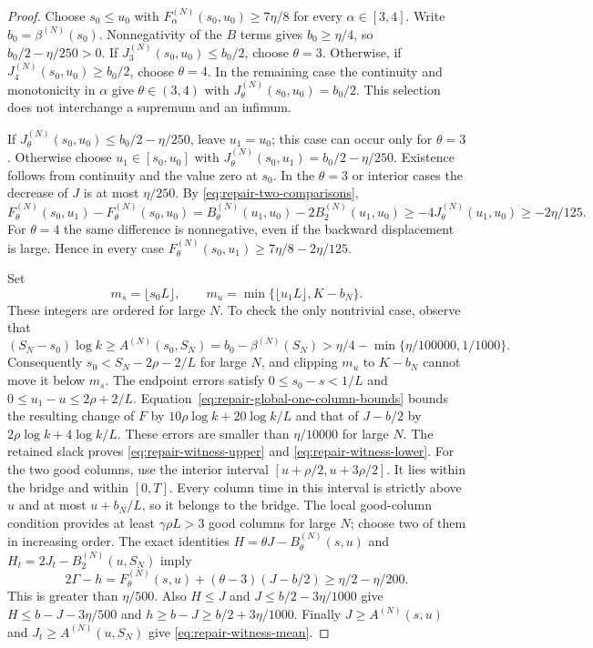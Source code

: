 \documentclass[11pt]{article}
\numberwithin{equation}{section}
\theoremstyle{definition}
\theoremstyle{remark}
\newcommand{\1}{\mathbf 1}
\begin{document}
\begin{proof}
Choose $s_0\le u_0$ with
$F_\alpha^{(N)}(s_0,u_0)\ge7\eta/8$ for every $\alpha\in[3,4]$.
Write $b_0=\beta^{(N)}(s_0)$.  Nonnegativity of the $B$ terms gives
$b_0\ge\eta/4$, so $b_0/2-\eta/250>0$.
If $J_3^{(N)}(s_0,u_0)\le b_0/2$, choose $\theta=3$.
Otherwise, if $J_4^{(N)}(s_0,u_0)\ge b_0/2$, choose $\theta=4$.
In the remaining case the continuity and monotonicity in $\alpha$ give
$\theta\in(3,4)$ with $J_\theta^{(N)}(s_0,u_0)=b_0/2$.
This selection does not interchange a supremum and an infimum.

If $J_\theta^{(N)}(s_0,u_0)\le b_0/2-\eta/250$, leave $u_1=u_0$;
this case can occur only for $\theta=3$.  Otherwise choose
$u_1\in[s_0,u_0]$ with
$J_\theta^{(N)}(s_0,u_1)=b_0/2-\eta/250$.
Existence follows from continuity and the value zero at $s_0$.
In the $\theta=3$ or interior cases the decrease of $J$ is at most
$\eta/250$.  By \eqref{eq:repair-two-comparisons},
\[
 F_\theta^{(N)}(s_0,u_1)-F_\theta^{(N)}(s_0,u_0)
 =B_\theta^{(N)}(u_1,u_0)-2B_2^{(N)}(u_1,u_0)
 \ge-4J_\theta^{(N)}(u_1,u_0)\ge-2\eta/125.
\]
For $\theta=4$ the same difference is nonnegative, even if the
backward displacement is large.  Hence in every case
$F_\theta^{(N)}(s_0,u_1)\ge7\eta/8-2\eta/125$.

Set
\[
 m_s=\lfloor s_0L\rfloor,\qquad
 m_u=\min\{\lfloor u_1L\rfloor,K-b_N\}.
\]
These integers are ordered for large $N$.  To check the only nontrivial
case, observe that
\[
 (S_N-s_0)\log k\ge A^{(N)}(s_0,S_N)
 =b_0-\beta^{(N)}(S_N)>\eta/4-\min\{\eta/100000,1/1000\}.
\]
Consequently $s_0<S_N-2\rho-2/L$ for large $N$, and clipping $m_u$ to
$K-b_N$ cannot move it below $m_s$.
The endpoint errors satisfy $0\le s_0-s<1/L$ and
$0\le u_1-u\le 2\rho+2/L$.
Equation~\eqref{eq:repair-global-one-column-bounds} bounds the resulting
change of $F$ by $10\rho\log k+20\log k/L$ and that of
$J-b/2$ by $2\rho\log k+4\log k/L$.
These errors are smaller than $\eta/10000$ for large $N$.
The retained slack proves \eqref{eq:repair-witness-upper} and
\eqref{eq:repair-witness-lower}.
For the two good columns, use the interior interval
$[u+\rho/2,u+3\rho/2]$. It lies within the bridge and within $[0,T]$.
Every column time in this interval is strictly above $u$ and at most
$u+b_N/L$, so it belongs to the bridge. The local good-column condition
provides at least $\gamma\rho L>3$ good columns for large $N$; choose two
of them in increasing order.
The exact identities $H=\theta J-B_\theta^{(N)}(s,u)$ and
$H_t=2J_t-B_2^{(N)}(u,S_N)$ imply
\[
 2\Gamma-h=F_\theta^{(N)}(s,u)+(\theta-3)(J-b/2)
 \ge\eta/2-\eta/200.
\]
This is greater than $\eta/500$.
Also $H\le J$ and $J\le b/2-3\eta/1000$ give
$H\le b-J-3\eta/500$ and $h\ge b-J\ge b/2+3\eta/1000$.
Finally $J\ge A^{(N)}(s,u)$ and $J_t\ge A^{(N)}(u,S_N)$ give
\eqref{eq:repair-witness-mean}.
\end{proof}
\end{document}
